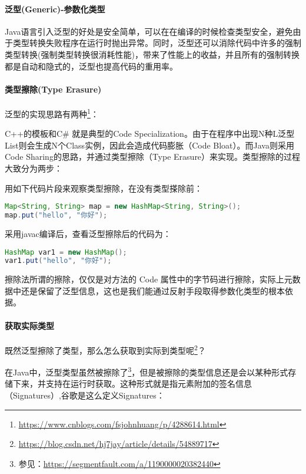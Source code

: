 \documentclass[../../../interview-questions.tex]{subfiles}
\begin{document}
\paragraph{泛型(Generic)-参数化类型}

Java语言引入泛型的好处是安全简单，可以在在编译的时候检查类型安全，避免由于类型转换失败程序在运行时抛出异常。同时，泛型还可以消除代码中许多的强制类型转换(强制类型转换很消耗性能)，带来了性能上的收益，并且所有的强制转换都是自动和隐式的，泛型也提高代码的重用率。

\paragraph{类型擦除(Type Erasure)}

泛型的实现思路有两种\footnote{\url{https://www.cnblogs.com/fsjohnhuang/p/4288614.html}}：



C++的模板和C\# 就是典型的Code Specialization。由于在程序中出现N种L泛型List则会生成N个Class实例，因此会造成代码膨胀（Code Bloat）。而Java则采用Code Sharing的思路，并通过类型擦除（Type Erasure）来实现。类型擦除的过程大致分为两步：


用如下代码片段来观察类型擦除，在没有类型搽除前：

\begin{lstlisting}[language=Java]
Map<String, String> map = new HashMap<String, String>();
map.put("hello", "你好");
\end{lstlisting}

采用javac编译后，查看泛型擦除后的代码为：

\begin{lstlisting}[language=Java]
HashMap var1 = new HashMap();
var1.put("hello", "你好");
\end{lstlisting}

擦除法所谓的擦除，仅仅是对方法的 Code 属性中的字节码进行擦除，实际上元数据中还是保留了泛型信息，这也是我们能通过反射手段取得参数化类型的根本依据。

\paragraph{获取实际类型}

既然泛型擦除了类型，那么怎么获取到实际到类型呢\footnote{\url{https://blog.csdn.net/hj7jay/article/details/54889717}}？

在Java中，泛型类型虽然被擦除了\footnote{参见：\url{https://segmentfault.com/a/1190000020382440}}，但是被擦除的类型信息还是会以某种形式存储下来，并支持在运行时获取。这种形式就是指元素附加的签名信息（Signatures）,谷歌是这么定义Signatures：
\end{document}
